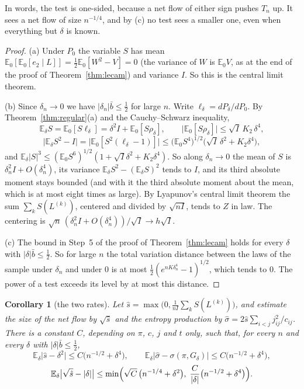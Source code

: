 \documentclass[11pt]{article}
\newtheorem{corollary}[theorem]{Corollary}
\theoremstyle{definition}
\theoremstyle{remark}
\newcommand{\E}{\mathbb E}
\begin{document}
In words, the test is one-sided, because a net flow of either sign pushes
$T_n$ up. It sees a net flow of size $n^{-1/4}$, and by (c) no test sees a
smaller one, even when everything but $\delta$ is known.

\begin{proof}
(a) Under $P_0$ the variable $S$ has mean $\E_0[\E_0[e_2\mid L]]=\frac12\E_0[W^2-V]=0$
(the variance of $W$ is $\E_0V$, as at the end of the proof of
Theorem~\ref{thm:lecam}) and variance $I$. So this is the central limit
theorem.

(b) Since $\delta_n\to0$ we have $\lvert\delta_n\rvert\bar b\le\frac12$ for
large $n$. Write $\ell_\delta=dP_\delta/dP_0$. By
Theorem~\ref{thm:regular}(a) and the Cauchy--Schwarz inequality,
\[
 \E_\delta S=\E_0[S\ell_\delta]=\delta^2I+\E_0[S\rho_\delta],\qquad
 \lvert\E_0[S\rho_\delta]\rvert\le\sqrt I\,K_2\,\delta^4 ,
\]
\[
 \bigl\lvert\E_\delta S^2-I\bigr\rvert=\bigl\lvert\E_0[S^2(\ell_\delta-1)]\bigr\rvert
 \le\bigl(\E_0S^4\bigr)^{1/2}\bigl(\sqrt I\,\delta^2+K_2\delta^4\bigr),
\]
and $\E_\delta\lvert S\rvert^3\le(\E_0S^6)^{1/2}(1+\sqrt I\delta^2+K_2\delta^4)$.
So along $\delta_n\to0$ the mean of $S$ is $\delta_n^2I+O(\delta_n^4)$, its
variance $\E_\delta S^2-(\E_\delta S)^2$ tends to $I$, and its third absolute
moment stays bounded (and with it the third absolute moment about the mean,
which is at most eight times as large). By
Lyapunov's central limit theorem the sum $\sum_kS(L^{(k)})$, centered and
divided by $\sqrt{nI}$, tends to $Z$ in law. The centering is
$\sqrt n\,(\delta_n^2I+O(\delta_n^4))/\sqrt I\to h\sqrt I$.

(c) The bound in Step~5 of the proof of Theorem~\ref{thm:lecam} holds for
every $\delta$ with $\lvert\delta\rvert\bar b\le\frac12$. So for large $n$ the
total variation distance between the laws of the sample under $\delta_n$ and
under $0$ is at most $\frac12(e^{nK\delta_n^4}-1)^{1/2}$, which tends to $0$. The power of a
test exceeds its level by at most this distance.
\end{proof}

\begin{corollary}[the two rates]\label{cor:local}
Let $\hat s=\max\bigl(0,\frac1{nI}\sum_kS(L^{(k)})\bigr)$, and estimate the
size of the net flow by $\sqrt{\hat s}$ and the entropy production by
$\hat\sigma=2\hat s\sum_{i<j}j_{ij}^2/c_{ij}$. There is a constant $C$, depending
on $\pi$, $c$, $j$ and $t$ only, such
that, for every $n$ and every $\delta$ with $\lvert\delta\rvert\bar b\le\frac12$,
\[
 \E_\delta\bigl\lvert\hat s-\delta^2\bigr\rvert\le C\bigl(n^{-1/2}+\delta^4\bigr),
 \qquad
 \E_\delta\bigl\lvert\hat\sigma-\sigma(\pi,G_\delta)\bigr\rvert
 \le C\bigl(n^{-1/2}+\delta^4\bigr),
\]
\[
 \E_\delta\bigl\lvert\sqrt{\hat s}-\lvert\delta\rvert\bigr\rvert
 \le\min\Bigl(\sqrt C\,\bigl(n^{-1/4}+\delta^2\bigr),\;
 \frac{C}{\lvert\delta\rvert}\bigl(n^{-1/2}+\delta^4\bigr)\Bigr).
\]
\end{corollary}
\end{document}
